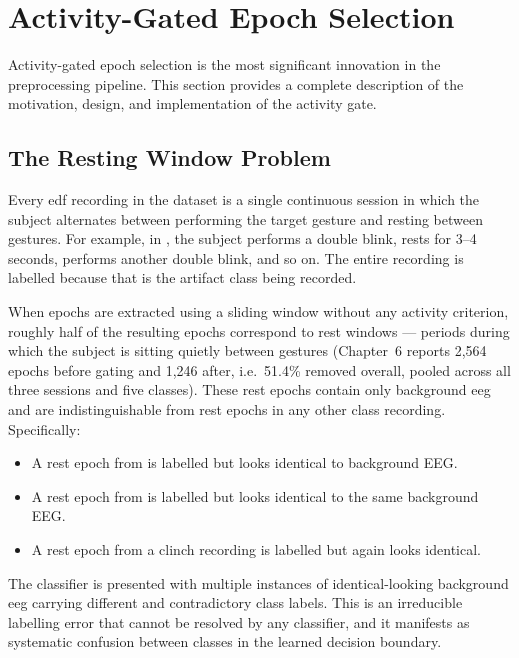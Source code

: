 \section{Activity-Gated Epoch Selection}
\label{sec:sp_gate}

Activity-gated epoch selection is the most significant
innovation in the preprocessing pipeline. This section provides
a complete description of the motivation, design, and
implementation of the activity gate.

\subsection{The Resting Window Problem}

Every \acrshort{edf} recording in the dataset is a single
continuous session in which the subject alternates between
performing the target gesture and resting between gestures.
For example, in , the subject performs a
double blink, rests for 3--4 seconds, performs another double
blink, and so on. The entire recording is labelled
 because that is the artifact class being
recorded.

When epochs are extracted using a sliding window without any
activity criterion, roughly half of the resulting epochs
correspond to rest windows — periods during which the subject
is sitting quietly between gestures (Chapter~6 reports 2{,}564
epochs before gating and 1{,}246 after, i.e.\ 51.4\% removed
overall, pooled across all three sessions and five classes).
These rest epochs contain
only background \acrshort{eeg} and are indistinguishable from
rest epochs in any other class recording. Specifically:

\begin{itemize}[leftmargin=*]
    \item A rest epoch from  is labelled
     but looks identical to background EEG.
    \item A rest epoch from  is labelled
     but looks identical to the same
    background EEG.
    \item A rest epoch from a clinch recording is labelled
     but again looks identical.
\end{itemize}

The classifier is presented with multiple instances of
identical-looking background \acrshort{eeg} carrying different
and contradictory class labels. This is an irreducible
labelling error that cannot be resolved by any classifier, and
it manifests as systematic confusion between classes in the
learned decision boundary.

